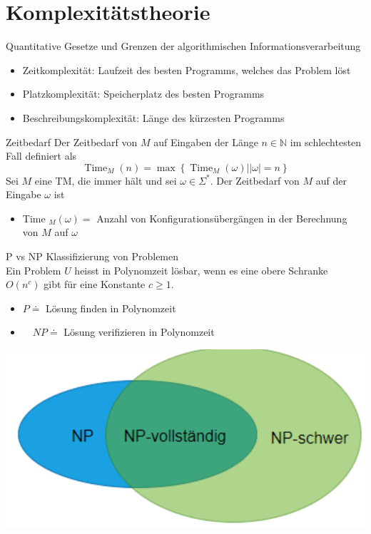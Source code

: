 \graphicspath{{images/}}

\section*{Komplexitätstheorie}

\begin{definition}{Quantitative Gesetze und Grenzen}
    der algorithmischen Informationsverarbeitung

    \begin{itemize}
    \item Zeitkomplexität: Laufzeit des besten Programms, welches das Problem löst
    \item Platzkomplexität: Speicherplatz des besten Programms
    \item Beschreibungskomplexität: Länge des kürzesten Programms
    \end{itemize}
\end{definition}

\begin{theorem}{Zeitbedarf}
    Der Zeitbedarf von $M$ auf Eingaben der Länge $n \in \mathbb{N}$ im schlechtesten Fall definiert als
    $$
    \operatorname{Time}_{M}(n)=\max \left\{\operatorname{Time}_{M}(\omega)|| \omega \mid=n\right\}
    $$
    Sei $M$ eine TM, die immer hält und sei $\omega \in \Sigma^{*}$. Der Zeitbedarf von $M$ auf der Eingabe $\omega$ ist
    \begin{itemize}
    \item Time $_{M}(\omega)=$ Anzahl von Konfigurationsübergängen in der Berechnung von $M$ auf $\omega$
    \end{itemize}
\end{theorem}

\begin{KR}{P vs NP}
    Klassifizierung von Problemen\\
    Ein Problem $U$ heisst in Polynomzeit lösbar, wenn es eine obere Schranke $O\left(n^{c}\right)$ gibt für eine Konstante $c \geq 1$.
    \begin{itemize}
    \item $P \doteq $ Lösung finden in Polynomzeit
    \item $\quad N P \doteq $ Lösung verifizieren in Polynomzeit
    \end{itemize}
    \includegraphics[width=0.5\linewidth]{p_vs_np.png}
\end{KR}

